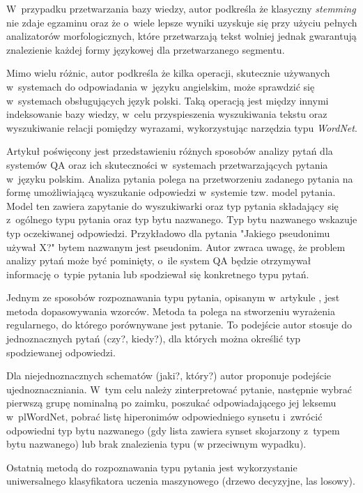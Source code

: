 W~przypadku przetwarzania bazy wiedzy, autor podkreśla że klasyczny \emph{stemming} nie zdaje egzaminu oraz że o~wiele lepsze wyniki uzyskuje się przy użyciu pełnych analizatorów morfologicznych, które przetwarzają tekst wolniej jednak gwarantują znalezienie każdej formy językowej dla przetwarzanego segmentu.

Mimo wielu różnic, autor podkreśla że kilka operacji, skutecznie używanych w~systemach do odpowiadania w~języku angielskim, może sprawdzić się w~systemach obsługujących język polski. Taką operacją jest między innymi indeksowanie bazy wiedzy, w~celu przyspieszenia wyszukiwania tekstu oraz wyszukiwanie relacji pomiędzy wyrazami, wykorzystując narzędzia typu \emph{WordNet}\cite{przybyla2012issues}.

Artykuł \cite{przybyla-2013-question} poświęcony jest przedstawieniu różnych sposobów analizy pytań dla systemów QA oraz ich skuteczności w~systemach przetwarzających pytania w~języku polskim. Analiza pytania polega na przetworzeniu zadanego pytania na formę umożliwiającą wyszukanie odpowiedzi w~systemie tzw. model pytania. Model ten zawiera zapytanie do wyszukiwarki oraz typ pytania składający się z~ogólnego typu pytania oraz typ bytu nazwanego. Typ bytu nazwanego wskazuje typ oczekiwanej odpowiedzi. Przykładowo dla pytania "Jakiego pseudonimu używał X?" bytem nazwanym jest pseudonim. Autor zwraca uwagę, że problem analizy pytań może być pominięty, o~ile system QA będzie otrzymywał informację o~typie pytania lub spodziewał się konkretnego typu pytań.

Jednym ze sposobów rozpoznawania typu pytania, opisanym w~artykule \cite{przybyla-2013-question}, jest metoda dopasowywania wzorców. Metoda ta polega na stworzeniu wyrażenia regularnego, do którego porównywane jest pytanie. To podejście autor stosuje do jednoznacznych pytań (czy?, kiedy?), dla których można określić typ spodziewanej odpowiedzi. 

Dla niejednoznacznych schematów (jaki?, który?) autor proponuje podejście ujednoznaczniania. W~tym celu należy zinterpretować pytanie, następnie wybrać pierwszą grupę nominalną po zaimku, poszukać odpowiadającego jej leksemu w~plWordNet, pobrać listę hiperonimów odpowiedniego synsetu i~zwrócić odpowiedni typ bytu nazwanego (gdy lista zawiera synset skojarzony z~typem bytu nazwanego) lub brak znalezienia typu (w przeciwnym wypadku).

Ostatnią metodą do rozpoznawania typu pytania jest wykorzystanie uniwersalnego klasyfikatora uczenia maszynowego (drzewo decyzyjne, las losowy).

